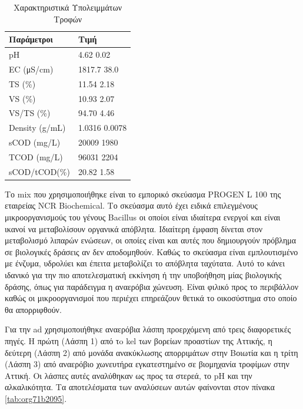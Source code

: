 \documentclass[11pt]{report}
\begin{document}
\begin{table}[htbp]
\caption{\label{tab:org520bdd9}Χαρακτηριστικά Υπολειμμάτων Τροφών}
\centering
\begin{tabular}{ll}
Παράμετροι & Τιμή\\[0pt]
\hline
pH & 4.62 \textpm{} 0.02\\[0pt]
EC (μS/cm) & 1817.7 \textpm{} 38.0\\[0pt]
TS (\%) & 11.54 \textpm{} 2.18\\[0pt]
VS (\%) & 10.93 \textpm{} 2.07\\[0pt]
VS/TS (\%) & 94.70 \textpm{} 4.46\\[0pt]
Density (g/mL) & 1.0316 \textpm{} 0.0078\\[0pt]
sCOD (mg/L) & 20009 \textpm{} 1980\\[0pt]
TCOD (mg/L) & 96031 \textpm{} 2204\\[0pt]
sCOD/tCOD(\%) & 20.82 \textpm{} 1.58\\[0pt]
\end{tabular}
\end{table}

Το \acrfull{mix} που χρησιμοποιήθηκε είναι το εμπορικό σκεύασμα PROGEN L 100 της εταιρείας NCR Biochemical. Το σκεύασμα αυτό έχει ειδικά επιλεγμένους μικροοργανισμούς του γένους Bacillus οι οποίοι είναι ιδιαίτερα ενεργοί και είναι ικανοί να μεταβολίσουν οργανικά απόβλητα. Ιδιαίτερη έμφαση δίνεται στον μεταβολισμό λιπαρών ενώσεων, οι οποίες είναι και αυτές που δημιουργούν πρόβλημα σε βιολογικές δράσεις αν δεν αποδομηθούν. Καθώς το σκεύασμα είναι εμπλουτισμένο με ένζυμα, υδρολύει και έπειτα μεταβολίζει το απόβλητα ταχύτατα. Αυτό το κάνει ιδανικό για την πιο αποτελεσματική εκκίνηση ή την υποβοήθηση μίας βιολογικής δράσης, όπως για παράδειγμα η αναερόβια χώνευση. Είναι φιλικό προς το περιβάλλον καθώς οι μικροοργανισμοί που περιέχει επηρεάζουν θετικά το οικοσύστημα στο οποίο θα απορριφθούν.

Για την \acrshort{ad} χρησιμοποιήθηκε αναερόβια λάσπη προερχόμενη από τρεις διαφορετικές πηγές. Η πρώτη (Λάσπη 1) από τo \acrfull{kel} των βορείων προαστίων της Αττικής, η δεύτερη (Λάσπη 2) από μονάδα ανακύκλωσης απορριμάτων στην Βοιωτία και η τρίτη (Λάσπη 3) από αναερόβιο χωνευτήρα εγκατεστημένο σε βιομηχανία τροφίμων στην Αττική. Οι λάσπες αυτές αναλύθηκαν ως προς τα στερεά, το pH και την αλκαλικότητα. Τα αποτελέσματα των αναλύσεων αυτών φαίνονται στον πίνακα \ref{tab:org71b2095}. 
\end{document}
